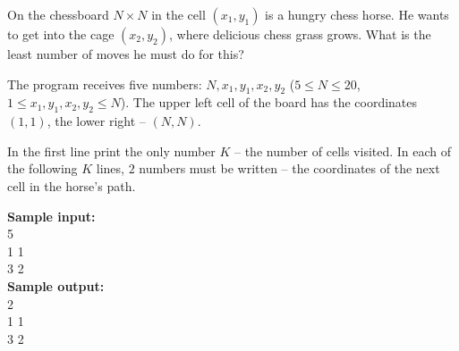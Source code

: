 \documentclass[a4paper]{article}
\begin{document}
On the chessboard $N \times N$ in the cell $(x_1, y_1)$ is a hungry chess horse. He wants to get into the cage $(x_2, y_2)$, where delicious chess grass grows. What is the least number of moves he must do for this?

The program receives five numbers: $N, x_1, y_1, x_2, y_2$ ($5 \le N \le 20$, $1 \le x_1, y_1, x_2, y_2 \le N$). The upper left cell of the board has the coordinates $(1, 1)$, the lower right -- $(N, N)$.

In the first line print the only number $K$ -- the number of cells visited. In each of the following $K$ lines, $2$ numbers must be written -- the coordinates of the next cell in the horse's path.

\SPACE

\noindent \textbf{Sample input:}\\
5\\
1 1\\
3 2\\


\noindent \textbf{Sample output:}\\
2\\
1 1\\
3 2\\
\end{document}

